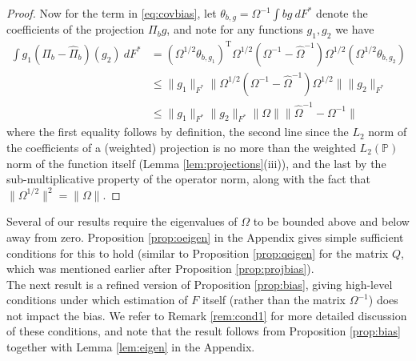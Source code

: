 \documentclass[11pt,twoside]{article}
\def\T{{ \mathrm{\scriptscriptstyle T} }}
\newcommand{\Pb}{\mathbb{P}}
\theoremstyle{definition}
\theoremstyle{remark}
\begin{document}
\begin{proof}
Now for the term in  \eqref{eq:covbias}, let $\theta_{b,g} = \Omega^{-1} \int b g \ dF^*$ denote the coefficients of the projection $\Pi_{b}g$, and note for any functions $g_1,g_2$ we have
\begin{align*}
\int g_1(\Pi_{b} - \widehat\Pi_{b})(g_2) \ dF^* %
&= \left( \Omega^{1/2} \theta_{b, g_1} \right)^\T \Omega^{1/2} (\Omega^{-1} - \widehat\Omega^{-1}) \Omega^{1/2}  \left( \Omega^{1/2} \theta_{b, g_2} \right) \\
&\leq \| g_1 \|_{F^*}  \| \Omega^{1/2} (\Omega^{-1} - \widehat\Omega^{-1}) \Omega^{1/2}  \| \| g_2 \|_{F^*} \\
&\leq  \| g_1 \|_{F^*} \| g_2 \|_{F^*}  \|  \Omega \| \| \widehat\Omega^{-1} - \Omega^{-1} \|  
\end{align*}
where the first equality follows by definition, the second line since the $L_2$ norm of the coefficients of a (weighted) projection is no more than the weighted $L_2(\Pb)$ norm of the function itself (Lemma \ref{lem:projections}(iii)), and the last by the sub-multiplicative property of the operator norm, along with the fact that $\| \Omega^{1/2} \|^2 = \| \Omega \|$. 
\end{proof}

\bigskip


Several of our results require the eigenvalues of $\Omega$ to be bounded above and below away from zero. Proposition \ref{prop:oeigen} in the Appendix gives simple sufficient conditions for this to hold (similar to Proposition \ref{prop:qeigen} for the matrix $Q$, which was mentioned earlier after Proposition \ref{prop:projbias}). \\


The next result  is a refined version of Proposition \ref{prop:bias}, giving high-level conditions under which estimation of $F$ itself (rather than the matrix $\Omega^{-1}$)  does not impact the bias. We refer to Remark \ref{rem:cond1} for more detailed discussion of these conditions, and note that the result follows from Proposition \ref{prop:bias} together with Lemma \ref{lem:eigen} in the Appendix. \\
\end{document}
